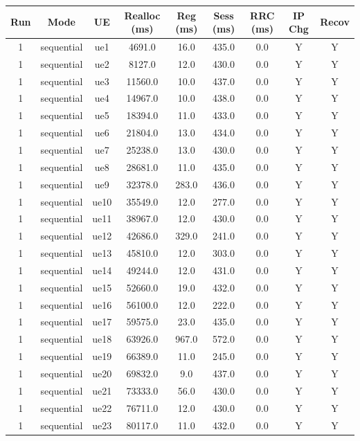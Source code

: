 \begin{table}[ht]
\centering
\begin{tabular}{|c|c|c|c|c|c|c|c|c|}
\hline
Run & Mode & UE & Realloc (ms) & Reg (ms) & Sess (ms) & RRC (ms) & IP Chg & Recov \\
\hline
1 & sequential & ue1 & 4691.0 & 16.0 & 435.0 & 0.0 & Y & Y \\
1 & sequential & ue2 & 8127.0 & 12.0 & 430.0 & 0.0 & Y & Y \\
1 & sequential & ue3 & 11560.0 & 10.0 & 437.0 & 0.0 & Y & Y \\
1 & sequential & ue4 & 14967.0 & 10.0 & 438.0 & 0.0 & Y & Y \\
1 & sequential & ue5 & 18394.0 & 11.0 & 433.0 & 0.0 & Y & Y \\
1 & sequential & ue6 & 21804.0 & 13.0 & 434.0 & 0.0 & Y & Y \\
1 & sequential & ue7 & 25238.0 & 13.0 & 430.0 & 0.0 & Y & Y \\
1 & sequential & ue8 & 28681.0 & 11.0 & 435.0 & 0.0 & Y & Y \\
1 & sequential & ue9 & 32378.0 & 283.0 & 436.0 & 0.0 & Y & Y \\
1 & sequential & ue10 & 35549.0 & 12.0 & 277.0 & 0.0 & Y & Y \\
1 & sequential & ue11 & 38967.0 & 12.0 & 430.0 & 0.0 & Y & Y \\
1 & sequential & ue12 & 42686.0 & 329.0 & 241.0 & 0.0 & Y & Y \\
1 & sequential & ue13 & 45810.0 & 12.0 & 303.0 & 0.0 & Y & Y \\
1 & sequential & ue14 & 49244.0 & 12.0 & 431.0 & 0.0 & Y & Y \\
1 & sequential & ue15 & 52660.0 & 19.0 & 432.0 & 0.0 & Y & Y \\
1 & sequential & ue16 & 56100.0 & 12.0 & 222.0 & 0.0 & Y & Y \\
1 & sequential & ue17 & 59575.0 & 23.0 & 435.0 & 0.0 & Y & Y \\
1 & sequential & ue18 & 63926.0 & 967.0 & 572.0 & 0.0 & Y & Y \\
1 & sequential & ue19 & 66389.0 & 11.0 & 245.0 & 0.0 & Y & Y \\
1 & sequential & ue20 & 69832.0 & 9.0 & 437.0 & 0.0 & Y & Y \\
1 & sequential & ue21 & 73333.0 & 56.0 & 430.0 & 0.0 & Y & Y \\
1 & sequential & ue22 & 76711.0 & 12.0 & 430.0 & 0.0 & Y & Y \\
1 & sequential & ue23 & 80117.0 & 11.0 & 432.0 & 0.0 & Y & Y \\

\end{tabular}
\end{table}
